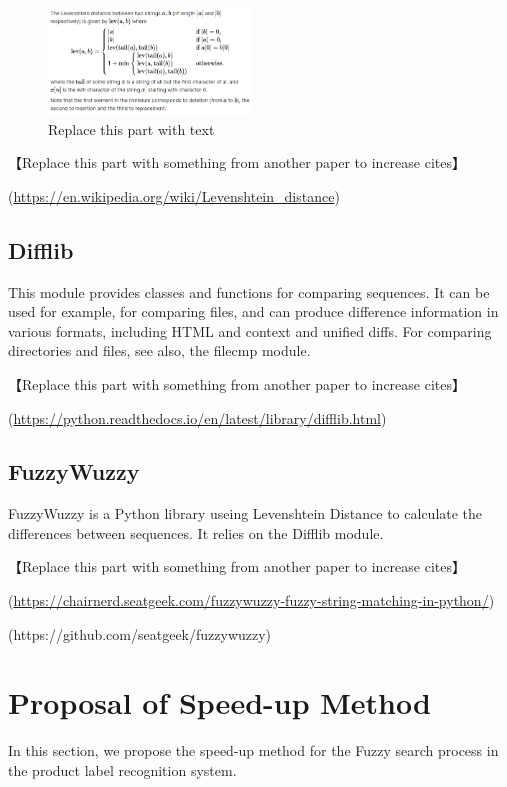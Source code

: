 \documentclass[technicalreport]{ieicej}
\begin{document}
        \begin{figure}[t] 
            \begin{center}
            \includegraphics[width=0.48\textwidth]{figure/levenshtein.png}
            \end{center}
            \caption{Replace this part with text}
            \label{fig:wiki}
        \end{figure}

        【Replace this part with something from another paper to increase cites】

        (\url{https://en.wikipedia.org/wiki/Levenshtein_distance})

    \subsection{Difflib}
        This module provides classes and functions for comparing sequences. It can be used for example, for comparing files, and can produce difference information in various formats, including HTML and context and unified diffs. For comparing directories and files, see also, the filecmp module.
        
        【Replace this part with something from another paper to increase cites】

        (\url{https://python.readthedocs.io/en/latest/library/difflib.html})
    
    \subsection{FuzzyWuzzy}
        FuzzyWuzzy is a Python library useing Levenshtein Distance to calculate the differences between sequences. It relies on the Difflib module.

        【Replace this part with something from another paper to increase cites】

        (\url{https://chairnerd.seatgeek.com/fuzzywuzzy-fuzzy-string-matching-in-python/})
        
        (https://github.com/seatgeek/fuzzywuzzy)

\section{Proposal of Speed-up Method}
\label{sec:algorithm}
    In this section, we propose the speed-up method for the Fuzzy search process in the product label recognition system.
\end{document}
